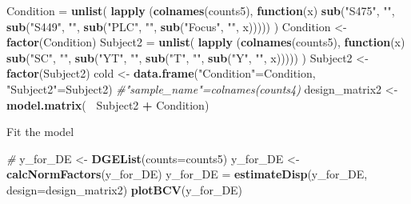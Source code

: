 \documentclass[]{article}
\newenvironment{Shaded}{\begin{snugshade}}{\end{snugshade}}
\newcommand{\KeywordTok}[1]{\textcolor[rgb]{0.13,0.29,0.53}{\textbf{#1}}}
\newcommand{\DataTypeTok}[1]{\textcolor[rgb]{0.13,0.29,0.53}{#1}}
\newcommand{\StringTok}[1]{\textcolor[rgb]{0.31,0.60,0.02}{#1}}
\newcommand{\CommentTok}[1]{\textcolor[rgb]{0.56,0.35,0.01}{\textit{#1}}}
\newcommand{\ControlFlowTok}[1]{\textcolor[rgb]{0.13,0.29,0.53}{\textbf{#1}}}
\newcommand{\OperatorTok}[1]{\textcolor[rgb]{0.81,0.36,0.00}{\textbf{#1}}}
\newcommand{\NormalTok}[1]{#1}
\begin{document}
\begin{Shaded}
\begin{Highlighting}[]
\NormalTok{Condition =}\StringTok{ }\KeywordTok{unlist}\NormalTok{( }\KeywordTok{lapply}\NormalTok{ (}\KeywordTok{colnames}\NormalTok{(counts5), }\ControlFlowTok{function}\NormalTok{(x) }\KeywordTok{sub}\NormalTok{(}\StringTok{"S475"}\NormalTok{, }\StringTok{""}\NormalTok{, }\KeywordTok{sub}\NormalTok{(}\StringTok{"S449"}\NormalTok{, }\StringTok{""}\NormalTok{, }\KeywordTok{sub}\NormalTok{(}\StringTok{"PLC"}\NormalTok{, }\StringTok{""}\NormalTok{, }\KeywordTok{sub}\NormalTok{(}\StringTok{"Focus"}\NormalTok{, }\StringTok{""}\NormalTok{, x))))) )}
\NormalTok{Condition  <-}\StringTok{ }\KeywordTok{factor}\NormalTok{(Condition)}
\NormalTok{Subject2 =}\StringTok{ }\KeywordTok{unlist}\NormalTok{( }\KeywordTok{lapply}\NormalTok{ (}\KeywordTok{colnames}\NormalTok{(counts5), }\ControlFlowTok{function}\NormalTok{(x) }\KeywordTok{sub}\NormalTok{(}\StringTok{"SC"}\NormalTok{, }\StringTok{""}\NormalTok{, }\KeywordTok{sub}\NormalTok{(}\StringTok{"YT"}\NormalTok{, }\StringTok{""}\NormalTok{, }\KeywordTok{sub}\NormalTok{(}\StringTok{"T"}\NormalTok{, }\StringTok{""}\NormalTok{, }\KeywordTok{sub}\NormalTok{(}\StringTok{"Y"}\NormalTok{, }\StringTok{""}\NormalTok{, x))))) )}
\NormalTok{Subject2 <-}\StringTok{ }\KeywordTok{factor}\NormalTok{(Subject2)}
\NormalTok{cold <-}\StringTok{ }\KeywordTok{data.frame}\NormalTok{(}\StringTok{"Condition"}\NormalTok{=Condition, }\StringTok{"Subject2"}\NormalTok{=Subject2) }\CommentTok{#"sample_name"=colnames(counts4)}
\NormalTok{design_matrix2 <-}\StringTok{ }\KeywordTok{model.matrix}\NormalTok{( }\OperatorTok{~}\NormalTok{Subject2 }\OperatorTok{+}\StringTok{ }\NormalTok{Condition)}
\end{Highlighting}
\end{Shaded}

Fit the model

\begin{Shaded}
\begin{Highlighting}[]
\CommentTok{# }
\NormalTok{y_for_DE <-}\StringTok{ }\KeywordTok{DGEList}\NormalTok{(}\DataTypeTok{counts=}\NormalTok{counts5)}
\NormalTok{y_for_DE <-}\StringTok{ }\KeywordTok{calcNormFactors}\NormalTok{(y_for_DE)}
\NormalTok{y_for_DE =}\StringTok{ }\KeywordTok{estimateDisp}\NormalTok{(y_for_DE, }\DataTypeTok{design=}\NormalTok{design_matrix2) }
\KeywordTok{plotBCV}\NormalTok{(y_for_DE)}
\end{Highlighting}
\end{Shaded}
\end{document}
